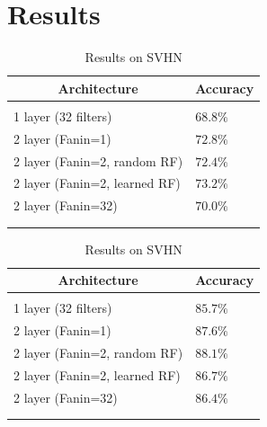 \documentclass{article} %
\begin{document}


\section{Results}
\label{sec-results}

\begin {table}
\parbox{.5\linewidth}{
\caption{Results on CIFAR-10}
\label{resuts-cifar10}
\begin{center}
\begin{tabular}{ll}
\multicolumn{1}{c}{\bf Architecture}  &\multicolumn{1}{c}{\bf Accuracy}
\\ \hline \\
1 layer (32 filters)                            & $68.8\%$\\
2 layer (Fanin=1)                            &$72.8\%$ \\
2 layer (Fanin=2, random RF)            &$72.4\%$ \\
2 layer (Fanin=2, learned RF)            &$73.2\%$\\
2 layer (Fanin=32)                          &$70.0\%$\\
\\ \hline \\
\end{tabular}
\end{center}
}
\parbox{.5\linewidth}{
\caption{Results on SVHN}
\label{resuts-svhn}
\begin{center}
\begin{tabular}{ll}
\multicolumn{1}{c}{\bf Architecture}  &\multicolumn{1}{c}{\bf Accuracy}
\\ \hline \\
1 layer (32 filters)                          & $85.7\%$\\
2 layer (Fanin=1)                           &$87.6\%$ \\
2 layer (Fanin=2, random RF)           &$88.1\%$ \\
2 layer (Fanin=2, learned RF)           &$86.7\%$\\
2 layer (Fanin=32)                        &$86.4\%$\\
\\ \hline \\
\end{tabular}
\end{center}
}
\end{table}
\end{document}
